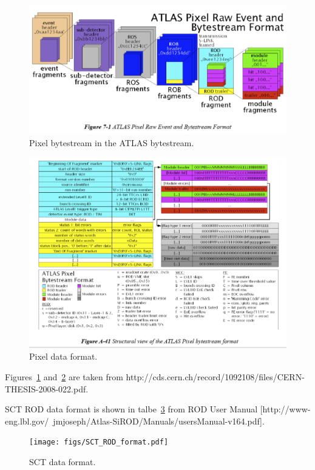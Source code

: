 \documentclass[10pt]{article}
\numberwithin{figure}{section}
\numberwithin{equation}{section}
\numberwithin{table}{section}
\newcommand{\0}{\phantom{0}}
\begin{document}
\begin{figure}
\begin{center}
\includegraphics[width=\textwidth]{figs/PIXEL_ROD_format_2.pdf}
\end{center}
\caption{\label{fig:pixel_bytestream}Pixel bytestream in the ATLAS bytestream.}
\end{figure}

\begin{figure}
\begin{center}
\includegraphics[width=\textwidth]{figs/PIXEL_ROD_format_1.pdf}
\end{center}
\caption{\label{fig:pixel_detailed_format}Pixel data format.}
\end{figure}

Figures~\ref{fig:pixel_bytestream} and~\ref{fig:pixel_detailed_format} are taken from http://cds.cern.ch/record/1092108/files/CERN-THESIS-2008-022.pdf.



SCT ROD data format is shown in talbe~\ref{fig:sct_rod_format} from ROD User Manual [http://www-eng.lbl.gov/~jmjoseph/Atlas-SiROD/Manuals/usersManual-v164.pdf].
\begin{figure}
\begin{center}
\texttt{[image: figs/SCT\_ROD\_format.pdf]}
\end{center}
\caption{\label{fig:sct_rod_format}SCT data format.}
\end{figure}
\end{document}
